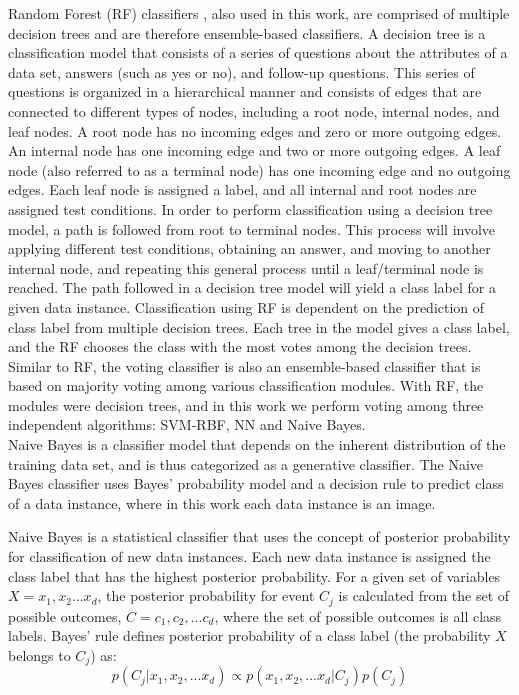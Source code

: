 Random Forest (RF) classifiers \cite{rf}, also used in this work, are comprised of multiple decision trees and are therefore ensemble-based classifiers. A decision tree is a classification model that consists of a series of questions about the attributes of a data set, answers (such as yes or no), and follow-up questions. This series of questions is organized in a hierarchical manner and consists of edges that are connected to different types of nodes, including a root node, internal nodes, and leaf nodes. A root node has no incoming edges and zero or more outgoing edges.  An internal node has one incoming edge and two or more outgoing edges. A leaf node (also referred to as a terminal node) has one incoming edge and no outgoing edges. Each leaf node is assigned a label, and all internal and root nodes are assigned test conditions.  In order to perform classification using a decision tree model, a path is followed from root to terminal nodes.  This process will involve applying different test conditions, obtaining an answer, and moving to another internal node, and repeating this general process until a leaf/terminal node is reached.  The path followed in a decision tree model will yield a class label for a given data instance. Classification using RF is dependent on the prediction of class label from multiple decision trees. Each tree in the model gives a class label, and the RF chooses the class with the most votes among the decision trees. 
Similar to RF, the voting classifier \cite{voting} is also an ensemble-based classifier that is based on majority voting among various classification modules. With RF, the modules were decision trees, and in this work we perform voting among three independent algorithms: SVM-RBF, NN and Naive Bayes. \\

Naive Bayes is a classifier model that depends on the inherent distribution of the training data set, and is thus categorized as a generative classifier.  The Naive Bayes classifier uses Bayes' probability model and a decision rule to predict class of a data instance, where in this work each data instance is an image.    

Naive Bayes is a statistical classifier that uses the concept of posterior probability for classification of new data instances.  Each new data instance is assigned the class label that has the highest posterior probability. For a given set of variables $X={x_{1}, x_{2}...x_{d}}$, the posterior probability for event $C_{j}$ is calculated from the set of possible outcomes, $C={c_{1}, c_{2}, ... c_{d}}$, where the set of possible outcomes is all class labels. Bayes' rule defines posterior probability of a class label (the probability $X$ belongs to $C_{j}$) as:
\begin{equation}
p(C_{j}|x_{1}, x_{2}, ... x_{d}) \propto p(x_{1}, x_{2}, ...x_{d} | C_{j})p(C_{j})
\end{equation}

